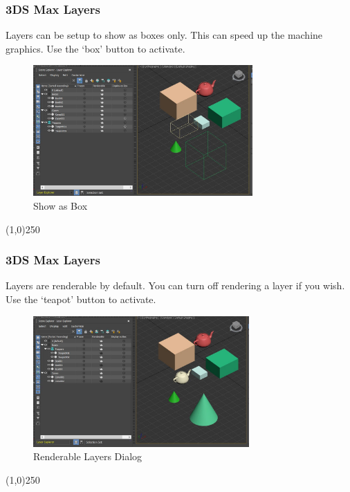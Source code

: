 \begin{frame}
\frametitle{3DS Max Layers}
Layers can be setup to show as boxes only.  This can speed up the machine graphics. Use the `box' button to activate.
\begin{figure}
	\centering
	\includegraphics[height=5cm]{3DSUI/DisplayAsBox}
	\caption[Show as Box]{Show as Box}
	\label{fig:allOn}
\end{figure}
\end{frame}
\begin{center}\line(1,0){250}\end{center}



\begin{frame}
\frametitle{3DS Max Layers}
Layers are renderable by default.  You can turn off rendering a layer if you wish. Use the `teapot' button to activate.
\begin{figure}
	\centering
	\includegraphics[height=5cm]{3DSUI/RenderableDialog}
	\caption[Renderable Layers Dialog]{Renderable Layers Dialog}
	\label{fig:allOn}
\end{figure}
\end{frame}
\begin{center}\line(1,0){250}\end{center}


